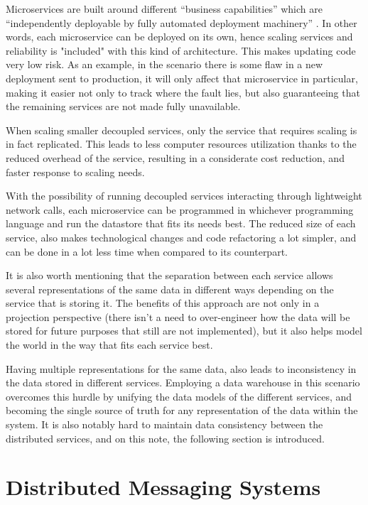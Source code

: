 Microservices are built around different ``business capabilities'' which are
``independently deployable by fully automated deployment machinery''
\cite{MartinFowlerMicroservices}. In other words, each microservice can be
deployed on its own, hence scaling services and reliability is "included" with
this kind of architecture. This makes updating code very low risk. As an
example, in the scenario there is some flaw in a new deployment sent to
production, it will only affect that microservice in particular, making it
easier not only to track where the fault lies, but also guaranteeing that the
remaining services are not made fully unavailable.

When scaling smaller decoupled services, only the service that requires scaling
is in fact replicated. This leads to less computer resources utilization thanks
to the reduced overhead of the service, resulting in a considerate cost
reduction, and faster response to scaling needs.

With the possibility of running decoupled services interacting through
lightweight network calls, each microservice can be programmed in whichever
programming language and run the datastore that fits its needs best. The reduced
size of each service, also makes technological changes and code refactoring a
lot simpler, and can be done in a lot less time when compared to its counterpart.

It is also worth mentioning that the separation between each service allows
several representations of the same data in different ways depending on the
service that is storing it. The benefits of this approach are not only in a
projection perspective (there isn't a need to over-engineer how the data
will be stored for future purposes that still are not implemented), but it also
helps model the world in the way that fits each service best. 

Having multiple representations for the same data, also leads to inconsistency
in the data stored in different services. Employing a data warehouse in this
scenario overcomes this hurdle by unifying the data models of the different
services, and becoming the single source of truth for any representation of the
data within the system. It is also notably hard to maintain data consistency
between the distributed services, and on this note, the following section is
introduced.

\section{Distributed Messaging Systems}\label{sec:DMS}

